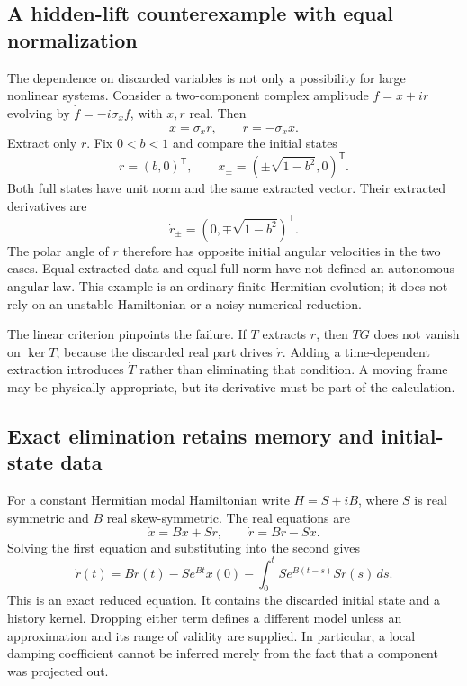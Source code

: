 \subsection{A hidden-lift counterexample with equal normalization}
The dependence on discarded variables is not only a possibility for
large nonlinear systems. Consider a two-component complex amplitude
$f=x+ir$ evolving by $\dot f=-i\sigma_x f$, with $x,r$ real.
Then
\begin{equation}
 \dot x=\sigma_xr,\qquad\dot r=-\sigma_xx.
\end{equation}
Extract only $r$. Fix $0<b<1$ and compare the initial states
\begin{equation}
 r=(b,0)^{\mathsf T},\qquad
 x_\pm=(\pm\sqrt{1-b^2},0)^{\mathsf T}.
\end{equation}
Both full states have unit norm and the same extracted vector. Their
extracted derivatives are
\begin{equation}
 \dot r_\pm=(0,\mp\sqrt{1-b^2})^{\mathsf T}.
\end{equation}
The polar angle of $r$ therefore has opposite initial angular
velocities in the two cases. Equal extracted data and equal full
norm have not defined an autonomous angular law. This example is an
ordinary finite Hermitian evolution; it does not rely on an unstable
Hamiltonian or a noisy numerical reduction.

The linear criterion pinpoints the failure. If $T$ extracts $r$,
then $TG$ does not vanish on $\ker T$, because the discarded real
part drives $\dot r$. Adding a time-dependent extraction introduces
$\dot T$ rather than eliminating that condition. A moving frame may
be physically appropriate, but its derivative must be part of the
calculation.

\subsection{Exact elimination retains memory and initial-state data}
For a constant Hermitian modal Hamiltonian write
$H=S+iB$, where $S$ is real symmetric and $B$ real skew-symmetric.
The real equations are
\begin{equation}
 \dot x=Bx+Sr,\qquad\dot r=Br-Sx.
\end{equation}
Solving the first equation and substituting into the second gives
\begin{equation}
 \dot r(t)=Br(t)-Se^{Bt}x(0)
       -\int_0^tSe^{B(t-s)}Sr(s)\,ds.
\end{equation}
This is an exact reduced equation. It contains the discarded initial
state and a history kernel. Dropping either term defines a different
model unless an approximation and its range of validity are supplied.
In particular, a local damping coefficient cannot be inferred merely
from the fact that a component was projected out.

